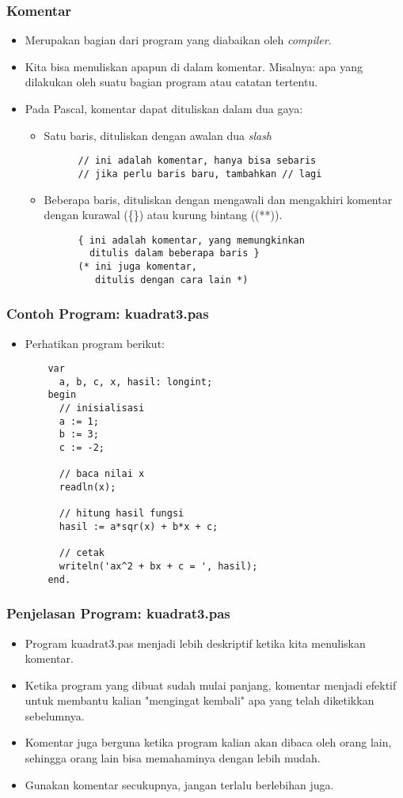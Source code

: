 \begin{frame}[fragile]
\frametitle{Komentar}
\begin{itemize}
  \item Merupakan bagian dari program yang diabaikan oleh \textit{compiler}.
  \item Kita bisa menuliskan apapun di dalam komentar. Misalnya: apa yang dilakukan oleh suatu bagian program atau catatan tertentu.
  \item Pada Pascal, komentar dapat dituliskan dalam dua gaya:
  \begin{itemize}
    \item Satu baris, dituliskan dengan awalan dua \textit{slash}
    \begin{lstlisting}
      // ini adalah komentar, hanya bisa sebaris
      // jika perlu baris baru, tambahkan // lagi
    \end{lstlisting}
    \item Beberapa baris, dituliskan dengan mengawali dan mengakhiri komentar dengan kurawal (\{\}) atau kurung bintang ((**)).
    \begin{lstlisting}
      { ini adalah komentar, yang memungkinkan
        ditulis dalam beberapa baris }
      (* ini juga komentar,
         ditulis dengan cara lain *)
    \end{lstlisting}
  \end{itemize}
\end{itemize}
\end{frame}

\begin{frame} [fragile]
\frametitle{Contoh Program: kuadrat3.pas}
\begin{itemize}
  \item Perhatikan program berikut:
  \begin{lstlisting}
    var
      a, b, c, x, hasil: longint;
    begin
      // inisialisasi
      a := 1;
      b := 3;
      c := -2;

      // baca nilai x
      readln(x);

      // hitung hasil fungsi
      hasil := a*sqr(x) + b*x + c;

      // cetak
      writeln('ax^2 + bx + c = ', hasil);
    end.
  \end{lstlisting}
\end{itemize}
\end{frame}

\begin{frame}
\frametitle{Penjelasan Program: kuadrat3.pas}
\begin{itemize}
  \item Program kuadrat3.pas menjadi lebih deskriptif ketika kita menuliskan komentar.
  \item Ketika program yang dibuat sudah mulai panjang, komentar menjadi efektif untuk membantu kalian "mengingat kembali" apa yang telah diketikkan sebelumnya.
  \item Komentar juga berguna ketika program kalian akan dibaca oleh orang lain, sehingga orang lain bisa memahaminya dengan lebih mudah.
  \item Gunakan komentar secukupnya, jangan terlalu berlebihan juga.
\end{itemize}
\end{frame}

